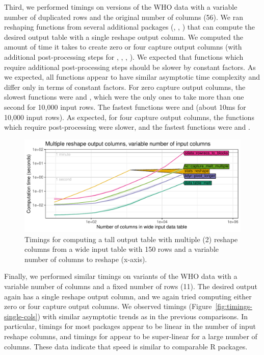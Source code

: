 Third, we performed timings on versions of the WHO data with a
variable number of duplicated rows and the original number of columns
(56). We ran reshaping functions from several additional packages
(, , ) that can compute the
desired output table with a single reshape output column. We computed
the amount of time it takes to create zero or four capture output
columns (with additional post-processing steps for
, ,
, ). We expected
that functions which require additional post-processing steps should be slower by
constant factors. As we expected, all functions appear to have similar
asymptotic time complexity and differ only in terms of constant
factors. For zero capture output columns, the slowest functions were
 and , which
were the only ones to take more than one second for 10,000 input
rows. The fastest functions were  and
 (about 10ms for 10,000 input
rows). As expected, for four capture output columns, the functions
which require post-processing were slower, and the fastest functions
were  and
. 

\begin{figure}
  \centering 
  \includegraphics[width = \textwidth]{figure-iris-cols-new.pdf}
  \vskip -0.3cm
  \caption{    
    Timings for computing a tall output table with multiple (2)
    reshape columns from a wide input table
    with 150 rows and a variable number of columns to
    reshape    
    (x-axis).}
  \label{fig:timings-multiple-cols}
\end{figure}

Finally, we performed similar timings on variants of the WHO data with
a variable number of columns and a fixed number of rows (11). The
desired output again has a single reshape output column, and we again
tried computing either zero or four capture output columns. We
observed timings (Figure~\ref{fig:timings-single-cols}) with similar
asymptotic trends as in the previous comparisons. In particular,
timings for most packages appear to be linear in the number of input
reshape columns, and timings for  appear to be super-linear
for a large number of columns. These data indicate that  speed
is similar to comparable R packages.

